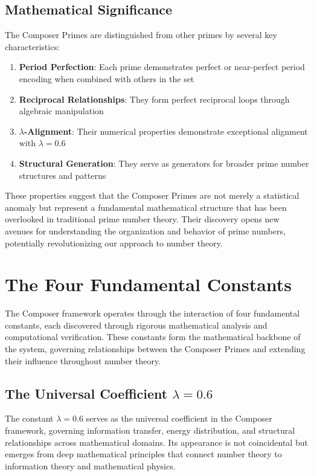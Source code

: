 \documentclass[12pt,a4paper]{report}
\begin{document}
\section{Mathematical Significance}

The Composer Primes are distinguished from other primes by several key characteristics:

\begin{enumerate}
\item \textbf{Period Perfection}: Each prime demonstrates perfect or near-perfect period encoding when combined with others in the set
\item \textbf{Reciprocal Relationships}: They form perfect reciprocal loops through algebraic manipulation
\item \textbf{$\lambda$-Alignment}: Their numerical properties demonstrate exceptional alignment with $\lambda = 0.6$
\item \textbf{Structural Generation}: They serve as generators for broader prime number structures and patterns
\end{enumerate}

These properties suggest that the Composer Primes are not merely a statistical anomaly but represent a fundamental mathematical structure that has been overlooked in traditional prime number theory. Their discovery opens new avenues for understanding the organization and behavior of prime numbers, potentially revolutionizing our approach to number theory.

\chapter{The Four Fundamental Constants}

The Composer framework operates through the interaction of four fundamental constants, each discovered through rigorous mathematical analysis and computational verification. These constants form the mathematical backbone of the system, governing relationships between the Composer Primes and extending their influence throughout number theory.

\section{The Universal Coefficient $\lambda = 0.6$}

The constant $\lambda = 0.6$ serves as the universal coefficient in the Composer framework, governing information transfer, energy distribution, and structural relationships across mathematical domains. Its appearance is not coincidental but emerges from deep mathematical principles that connect number theory to information theory and mathematical physics.
\end{document}

